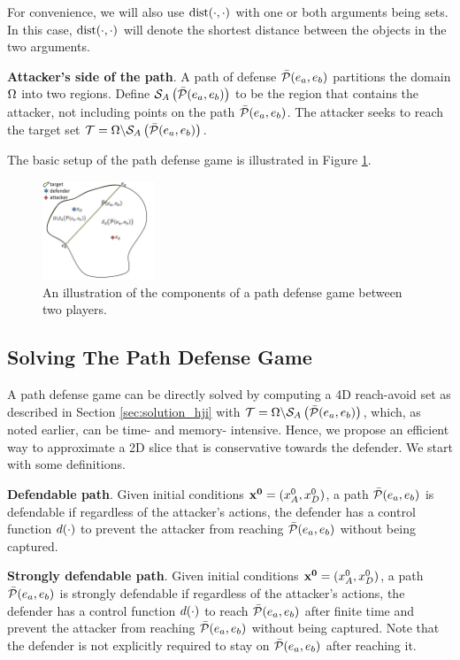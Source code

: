For convenience, we will also use $\text{dist}(\cdot,\cdot)$ with one or both arguments being sets. In this case, $\text{dist}(\cdot,\cdot)$ will denote the shortest distance between the objects in the two arguments.

\begin{defn} %
\textbf{Attacker's side of the path}. A path of defense $\bar{\mathcal{P}}(e_a,e_b)$ partitions the domain $\Omega$ into two regions. Define $\mathcal{S}_A\left(\bar{\mathcal{P}}(e_a,e_b)\right)$ to be the region that contains the attacker, not including points on the path $\bar{\mathcal{P}}(e_a,e_b)$. The attacker seeks to reach the target set $\mathcal{T}=\Omega\backslash\mathcal{S}_A\left(\bar{\mathcal{P}}(e_a,e_b)\right)$.
\end{defn}

The basic setup of the path defense game is illustrated in Figure \ref{fig:pd_form}.
\begin{figure}
\centering
\includegraphics[width=0.3\textwidth]{"fig/path defense game"}
\caption{An illustration of the components of a path defense game between two players.}
\label{fig:pd_form}
\end{figure}

\subsection{Solving The Path Defense Game}
A path defense game can be directly solved by computing a 4D reach-avoid set as described in Section \ref{sec:solution_hji} with $\mathcal{T}=\Omega\backslash\mathcal{S}_A\left(\bar{\mathcal{P}}(e_a,e_b)\right)$, which, as noted earlier, can be time- and memory- intensive. Hence, we propose an efficient way to approximate a 2D slice that is conservative towards the defender. We start with some definitions.

\begin{defn} %
\textbf{Defendable path}. Given initial conditions $\mathbf{x^0}=(x_A^0,x_D^0)$, a path $\bar{\mathcal{P}}(e_a,e_b)$ is defendable if regardless of the attacker's actions, the defender has a control function $d(\cdot)$ to prevent the attacker from reaching $\bar{\mathcal{P}}(e_a,e_b)$ without being captured.
\end{defn}

\begin{defn} %
\textbf{Strongly defendable path}. Given initial conditions $\mathbf{x^0}=(x_A^0,x_D^0)$, a path $\bar{\mathcal{P}}(e_a,e_b)$ is strongly defendable if regardless of the attacker's actions, the defender has a control function $d(\cdot)$ to reach $\bar{\mathcal{P}}(e_a,e_b)$ after finite time and prevent the attacker from reaching $\bar{\mathcal{P}}(e_a,e_b)$ without being captured. Note that the defender is not explicitly required to stay on $\bar{\mathcal{P}}(e_a,e_b)$ after reaching it.
\end{defn}

